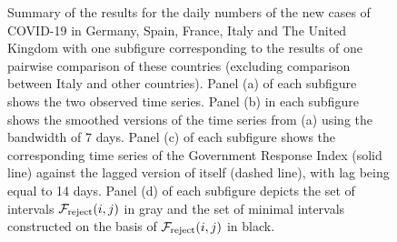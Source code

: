 \documentclass[a4paper,12pt]{article}
\numberwithin{equation}{section}
\begin{document}
\begin{figure}[t!]
\caption{Summary of the results for the daily numbers of the new cases of COVID-19 in Germany, Spain, France, Italy and The United Kingdom with one subfigure corresponding to the results of one pairwise comparison of these countries (excluding comparison between Italy and other countries). Panel (a) of each subfigure shows the two observed time series. Panel (b) in each subfigure shows the smoothed versions of the time series from (a) using the bandwidth of $7$ days. Panel (c) of each subfigure shows the corresponding time series of the Government Response Index (solid line) against the lagged version of itself (dashed line), with lag being equal to 14 days. Panel (d) of each subfigure depicts the set of intervals $\mathcal{F}_{\text{reject}}(i,j)$ in gray and the set of minimal intervals constructed on the basis of $\mathcal{F}_{\text{reject}}(i,j)$ in black.}\label{s:fig:covid19}
\end{figure}
\end{document}
